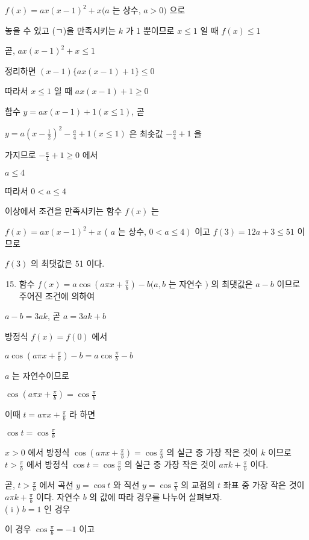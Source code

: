 \documentclass[10pt]{article}
\begin{document}
$f(x)=a x(x-1)^{2}+x(a$ 는 상수, $a>0)$ 으로

놓을 수 있고 (ㄱ)을 만족시키는 $k$ 가 1 뿐이므로 $x \leq 1$ 일 때 $f(x) \leq 1$

곧, $a x(x-1)^{2}+x \leq 1$

정리하면 $(x-1)\{a x(x-1)+1\} \leq 0$

따라서 $x \leq 1$ 일 때 $a x(x-1)+1 \geq 0$

함수 $y=a x(x-1)+1(x \leq 1)$, 곧

$y=a\left(x-\frac{1}{2}\right)^{2}-\frac{a}{4}+1(x \leq 1)$ 은 최솟값 $-\frac{a}{4}+1$ 을

가지므로 $-\frac{a}{4}+1 \geq 0$ 에서

$a \leq 4$

따라서 $0<a \leq 4$

이상에서 조건을 만족시키는 함수 $f(x)$ 는

$f(x)=a x(x-1)^{2}+x$ ( $a$ 는 상수, $\left.0<a \leq 4\right)$ 이고 $f(3)=12 a+3 \leq 51$ 이므로

$f(3)$ 의 최댓값은 51 이다.

\begin{enumerate}
  \setcounter{enumi}{14}
  \item 함수 $f(x)=a \cos \left(a \pi x+\frac{\pi}{b}\right)-b(a, b$ 는 자연수 $)$ 의 최댓값은 $a-b$ 이므로 주어진 조건에 의하여
\end{enumerate}

$a-b=3 a k$, 곧 $a=3 a k+b$

방정식 $f(x)=f(0)$ 에서

$a \cos \left(a \pi x+\frac{\pi}{b}\right)-b=a \cos \frac{\pi}{b}-b$

$a$ 는 자연수이므로

$\cos \left(a \pi x+\frac{\pi}{b}\right)=\cos \frac{\pi}{b}$

이때 $t=a \pi x+\frac{\pi}{b}$ 라 하면

$\cos t=\cos \frac{\pi}{b}$

$x>0$ 에서 방정식 $\cos \left(a \pi x+\frac{\pi}{b}\right)=\cos \frac{\pi}{b}$ 의 실근 중 가장 작은 것이 $k$ 이므로 $t>\frac{\pi}{b}$ 에서 방정식 $\cos t=\cos \frac{\pi}{b}$ 의 실근 중 가장 작은 것이 $a \pi k+\frac{\pi}{b}$ 이다.

곧, $t>\frac{\pi}{b}$ 에서 곡선 $y=\cos t$ 와 직선 $y=\cos \frac{\pi}{b}$ 의 교점의 $t$ 좌표 중 가장 작은 것이 $a \pi k+\frac{\pi}{b}$ 이다. 자연수 $b$ 의 값에 따라 경우를 나누어 살펴보자.\\
( i ) $b=1$ 인 경우

이 경우 $\cos \frac{\pi}{b}=-1$ 이고
\end{document}
